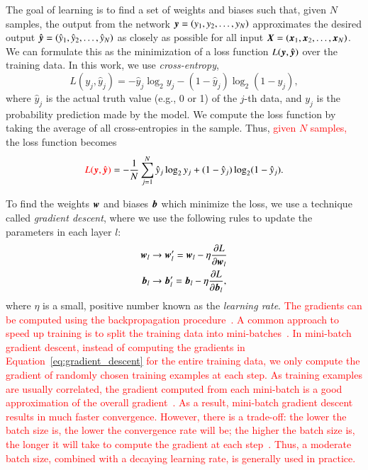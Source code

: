 \documentclass[fleqn,usenatbib]{mnras}
\newcommand{\eg}{{e.g., }}
\newcommand{\changed}[1]{\textcolor{red}{#1}}
\begin{document}
The goal of learning is to find a set of weights and biases such that,
given $N$ samples, the output from the network
$\bmath{y}=\left(y_1, y_2, \dots, y_N \right)$ approximates the desired output
$\hat{\bmath{y}}=\left(\hat{y}_1, \hat{y}_2, \dots, \hat{y}_N \right)$
as closely as possible for all input
$\bmath{X}=\left(\bmath{x}_1,\bmath{x}_2,\dots,\bmath{x}_N\right)$.
We can formulate this as the minimization of a loss function
$L(\bmath{y},\hat{\bmath{y}})$
over the training data.
In this work, we use \textit{cross-entropy},
\begin{equation}
  L(y_j, \hat{y}_j) = -\hat{y}_j \log_2 y_j - (1 - \hat{y}_j) \log_2(1 - y_j),
  \label{eq:cross_entropy}
\end{equation}
where $\hat{y}_j$ is the actual truth value (\eg 0 or 1) of the $j$-th data, and
$y_j$ is the probability prediction made by the model.
We compute the loss function by taking the average of all cross-entropies in the sample.
Thus,
\changed{
given $N$ samples,
}
the loss function becomes
\begin{equation}
\changed{
  L(\bmath{y}, \hat{\bmath{y}})
}
= - \frac{1}{N} \sum_{j=1}^{N} \hat{y}_j  \log_2 y_j
    + (1 - \hat{y}_j)  \log_2 (1 - \hat y_j).
  \label{eq:cross_entropy_all}
\end{equation}

To find the weights $\bmath{w}$ and biases $\bmath{b}$ which minimize the loss,
we use a technique called \textit{gradient descent},
where we use the following rules to update the parameters in each layer $l$:
\begin{align}
  \bmath{w}_l &\rightarrow
  \bmath{w}_l^{\prime}
  = \bmath{w}_l - \eta \frac{\partial L}{\partial \bmath{w}_l} \nonumber \\
  \bmath{b}_l &\rightarrow
  \bmath{b}_l^{\prime}
  = \bmath{b}_l - \eta \frac{\partial L}{\partial \bmath{b}_l},
  \label{eq:gradient_descent}
\end{align}
where $\eta$ is a small, positive number known as the \textit{learning rate}.
\changed{
The gradients can be computed using the backpropagation
procedure~\citep{rumelhart1988learning}.
A common approach to speed up training is to split the training data
into mini-batches~\citep{lecun1998efficient}.
In mini-batch gradient descent, instead of computing the gradients in
Equation~\ref{eq:gradient_descent} for the entire training data,
we only compute the gradient of randomly chosen training examples at each step.
As training examples are usually correlated,
the gradient computed from each mini-batch is a good approximation
of the overall gradient~\citep{bottou1998online}.
As a result, mini-batch gradient descent results in much faster convergence.
However, there is a trade-off: the lower the batch size is,
the lower the convergence rate will be;
the higher the batch size is, the longer it will take to compute the gradient
at each step~\citep{bousquet2008tradeoffs}.
Thus, a moderate batch size, combined with a decaying learning rate, is
generally used in practice.
}
\end{document}
